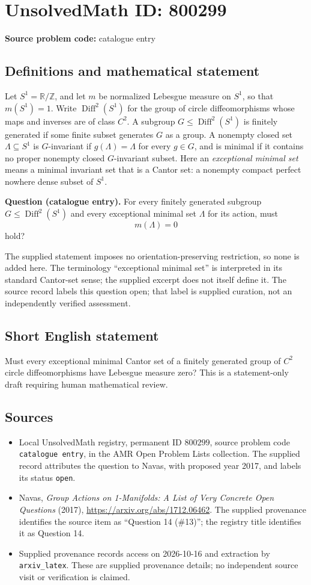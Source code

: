 \documentclass[11pt]{article}
\newcommand{\Z}{\mathbb{Z}}
\newcommand{\R}{\mathbb{R}}
\begin{document}
\section*{UnsolvedMath ID: 800299}
\textbf{Source problem code:} catalogue entry
\subsection{Definitions and mathematical statement}
Let \(S^1=\R/\Z\), and let \(m\) be normalized Lebesgue measure on \(S^1\), so that \(m(S^1)=1\). Write \(\operatorname{Diff}^{2}(S^1)\) for the group of circle diffeomorphisms whose maps and inverses are of class \(C^2\). A subgroup \(G\leq\operatorname{Diff}^{2}(S^1)\) is finitely generated if some finite subset generates \(G\) as a group. A nonempty closed set \(\Lambda\subseteq S^1\) is \(G\)-invariant if \(g(\Lambda)=\Lambda\) for every \(g\in G\), and is minimal if it contains no proper nonempty closed \(G\)-invariant subset. Here an \emph{exceptional minimal set} means a minimal invariant set that is a Cantor set: a nonempty compact perfect nowhere dense subset of \(S^1\).

\textbf{Question (catalogue entry).} For every finitely generated subgroup \(G\leq\operatorname{Diff}^{2}(S^1)\) and every exceptional minimal set \(\Lambda\) for its action, must
\[
 m(\Lambda)=0
\]
hold?

The supplied statement imposes no orientation-preserving restriction, so none is added here. The terminology ``exceptional minimal set'' is interpreted in its standard Cantor-set sense; the supplied excerpt does not itself define it. The source record labels this question open; that label is supplied curation, not an independently verified assessment.
\subsection{Short English statement}
Must every exceptional minimal Cantor set of a finitely generated group of \(C^2\) circle diffeomorphisms have Lebesgue measure zero? This is a statement-only draft requiring human mathematical review.
\subsection{Sources}
\begin{itemize}
\item Local UnsolvedMath registry, permanent ID \(800299\), source problem code \texttt{catalogue entry}, in the AMR Open Problem Lists collection. The supplied record attributes the question to Navas, with proposed year 2017, and labels its status \texttt{open}.
\item Navas, \emph{Group Actions on 1-Manifolds: A List of Very Concrete Open Questions} (2017), \url{https://arxiv.org/abs/1712.06462}. The supplied provenance identifies the source item as ``Question 14 (\#13)''; the registry title identifies it as Question 14.
\item Supplied provenance records access on 2026-10-16 and extraction by \texttt{arxiv\_latex}. These are supplied provenance details; no independent source visit or verification is claimed.
\end{itemize}
\end{document}
